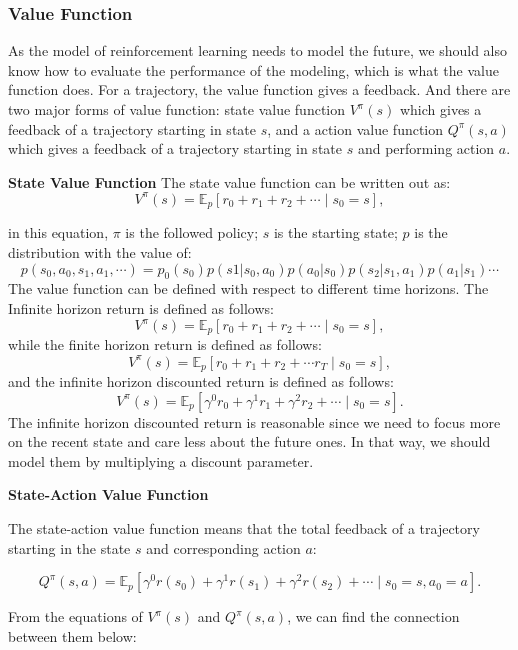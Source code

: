 \documentclass[11pt]{article}
\begin{document}
\subsubsection{Value Function}

As the model of reinforcement learning needs to model the future, we should also know how to evaluate the performance of the modeling, which is what the value function does.
%
For a trajectory, the value function gives a feedback. And there are two major forms of value function: state value function $V^{\pi}(s)$ which gives a feedback of a trajectory starting in state $s$, and a action value function $Q^{\pi}(s, a)$ which gives a feedback of a trajectory starting in state $s$ and performing action $a$.

\textbf{State Value Function}
The state value function can be written out as:
$$V^{\pi}(s)=\mathbb{E}_{p}\left[r_{0}+r_{1}+r_{2}+\cdots \mid s_{0}=s\right], $$

in this equation, $\pi$ is the followed policy; $s$ is the starting state; $p$ is the distribution with the value of:
$$p(s_0, a_0, s_1, a_1, \cdots) = p_0(s_0) p(s1|s_0,a_0) p(a_0|s_0) p(s_2|s_1,a_1) p(a_1|s_1)\cdots$$
%
The value function can be defined with respect to different time horizons. The Infinite horizon return is defined as follows:
$$ V^{\pi}(s)=\mathbb{E}_{p}\left[r_{0}+r_{1}+r_{2}+\cdots \mid s_{0}=s\right],$$
while the finite horizon return is defined as follows:
$$ V^{\pi}(s)=\mathbb{E}_{p}\left[r_{0}+r_{1}+r_{2}+\cdots r_{T} \mid s_{0}=s\right],$$
and the infinite horizon discounted return is defined as follows:
$$ V^{\pi}(s)=\mathbb{E}_{p}\left[\gamma^{0} r_{0}+\gamma^{1} r_{1}+\gamma^{2} r_{2}+\cdots \mid s_{0}=s\right].$$
The infinite horizon discounted return is reasonable since we need to focus more on the recent state and care less about the future ones. In that way, we should model them by multiplying a discount parameter.



\textbf{State-Action Value Function}

The state-action value function means that the total feedback of a trajectory starting in the state $s$ and corresponding action $a$:

$$Q^{\pi}(s, a)=\mathbb{E}_{p}\left[\gamma^{0} r\left(s_{0}\right)+\gamma^{1} r\left(s_{1}\right)+\gamma^{2} r\left(s_{2}\right)+\cdots \mid s_{0}=s, a_{0}=a\right].$$

From the equations of $V^{\pi}(s)$ and $Q^{\pi}(s, a)$, we can find the connection between them below:
\end{document}
